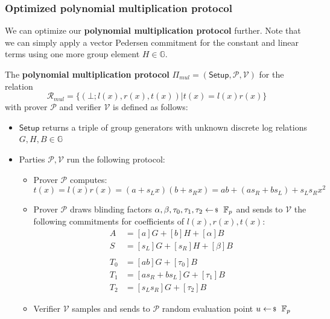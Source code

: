 \documentclass[../lecture-notes-148x210.tex]{subfiles}
\begin{document}
\subsubsection{Optimized polynomial multiplication protocol}
We can optimize our \textbf{polynomial multiplication protocol} further. Note that we can simply apply a vector Pedersen commitment for the constant and linear terms using one more group element $H \in \mathbb{G}$.

\begin{definition}
    The \textbf{polynomial multiplication protocol} $\Pi_{mul} = (\mathsf{Setup}, \mathcal{P,V})$ for the relation $$\mathcal{R}_{mul} = \{ (\bot;l(x),r(x),t(x)) \vert t(x) = l(x)r(x)\}$$ with prover $\mathcal{P}$ and verifier $\mathcal{V}$ is defined as follows:
    \begin{itemize}
        \item $\mathsf{Setup}$ returns a triple of group generators with unknown discrete log relations $G, H, B \in \mathbb{G}$
        \item Parties $\mathcal{P, V}$ run the following protocol:
            \begin{itemize}
                \item Prover $\mathcal{P}$ computes:
                    $$t(x) = l(x)r(x) = (a+s_L x)(b+s_R x) = ab + (as_R + bs_L) + s_L s_R x^2$$
                \item Prover $\mathcal{P}$ draws blinding factors $\alpha, \beta, \tau_0, \tau_1, \tau_2 \leftarrowS \mathbb{F}_p$ and sends to $\mathcal{V}$ the following commitments for coefficients of $l(x), r(x), t(x)$:
                    \begin{equation}
                        \begin{aligned}
                            A &= [a]G + [b]H + [\alpha]B\\
                            S &= [s_L]G + [s_R]H + [\beta]B\\
                            &\\ %
                            T_0 &= [ab]G + [\tau_0]B \\
                            T_1 &= [as_R + bs_L]G + [\tau_1]B \\
                            T_2 &= [s_L s_R]G + [\tau_2]B
                        \end{aligned}
                    \end{equation}
                \item Verifier $\mathcal{V}$ samples and sends to $\mathcal{P}$ random evaluation point $u \leftarrowS \mathbb{F}_p$

\end{itemize}
\end{itemize}
\end{definition}
\end{document}
